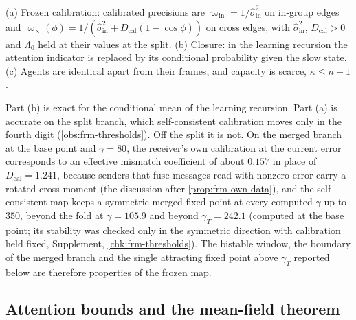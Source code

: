\begin{assumption}\label{asm:frm-mean-field}
(a) Frozen calibration: calibrated precisions are $\varpi_{\mathrm{in}}=1/\hat\sigma^2_{\mathrm{in}}$ on in-group edges and $\varpi_\times(\phi)=1/(\hat\sigma^2_{\mathrm{in}}+D_{\mathrm{cal}}(1-\cos\phi))$ on cross edges, with $\hat\sigma^2_{\mathrm{in}}$, $D_{\mathrm{cal}}>0$ and $\Lambda_0$ held at their values at the split. (b) Closure: in the learning recursion the attention indicator is replaced by its conditional probability given the slow state. (c) Agents are identical apart from their frames, and capacity is scarce, $\kappa\le n-1$.
\end{assumption}

Part (b) is exact for the conditional mean of the learning recursion. Part (a) is accurate on the split branch, which self-consistent calibration moves only in the fourth digit (\cref{obs:frm-thresholds}). Off the split it is not. On the merged branch at the base point and $\gamma=80$, the receiver's own calibration at the current error corresponds to an effective mismatch coefficient of about $0.157$ in place of $D_{\mathrm{cal}}=1.241$, because senders that fuse messages read with nonzero error carry a rotated cross moment (the discussion after \cref{prop:frm-own-data}), and the self-consistent map keeps a symmetric merged fixed point at every computed $\gamma$ up to $350$, beyond the fold at $\gamma=105.9$ and beyond $\gamma_T=242.1$ (computed at the base point; its stability was checked only in the symmetric direction with calibration held fixed, Supplement, \cref{chk:frm-thresholds}). The bistable window, the boundary of the merged branch and the single attracting fixed point above $\gamma_T$ reported below are therefore properties of the frozen map.

\subsection{Attention bounds and the mean-field theorem}\label{sec:frm-meanfield}

